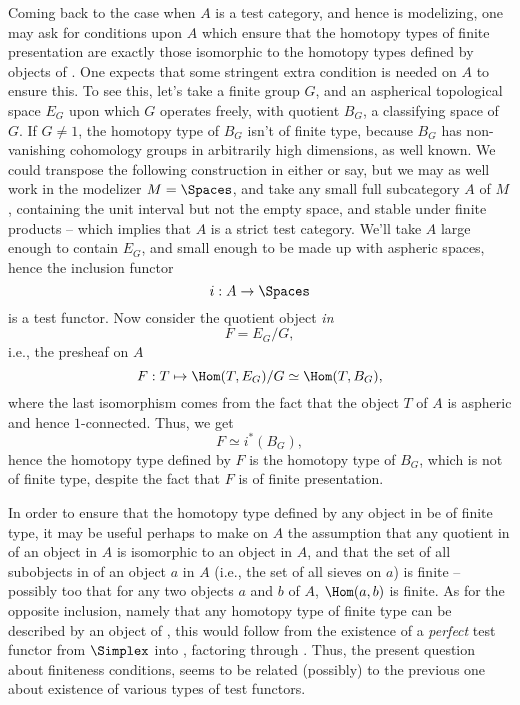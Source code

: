 Coming back to the case when $A$ is a test category, and hence \Ahat{}
is modelizing, one may ask for conditions upon $A$ which ensure that
the homotopy types of finite presentation are exactly those isomorphic
to the homotopy types defined by objects of \Ahatfp. One expects that
some stringent extra condition is needed on $A$ to ensure
this. To see this, let's take a finite group $G$, and an aspherical
topological space $E_G$ upon which $G$ operates freely, with quotient
$B_G$, a classifying space of $G$. If $G\ne1$, the homotopy type of
$B_G$ isn't of finite type, because $B_G$ has non-vanishing cohomology
groups in arbitrarily high dimensions, as well known. We could
transpose the following construction in either \Cat{} or \Simplexhat{}
say, but we may as well work in the modelizer $M=\Spaces$, and take
any small full subcategory $A$ of $M$, containing the unit interval
but not the empty space, and stable under finite products -- which
implies that $A$ is a strict test category. We'll take $A$ large
enough to contain $E_G$, and small enough to be made up with aspheric
spaces, hence the inclusion functor
\[i: A\to\Spaces\]
is a test functor. Now consider the quotient object \emph{in} \Ahat
\[F = E_G / G,\]
i.e., the presheaf on $A$
\[ F : T\mapsto \Hom(T,E_G)/G \simeq \Hom(T,B_G),\]
where the last isomorphism comes from the fact that the object $T$ of
$A$ is aspheric and hence $1$-connected. Thus, we get
\[F\simeq i^*(B_G),\]
hence the homotopy type defined by $F$ is the homotopy type of $B_G$,
which is not of finite type, despite the fact that $F$ is of finite
presentation.

In order to ensure that the homotopy type defined by any object in
\Ahatfp{} be of finite type, it may be useful perhaps to make on $A$
the assumption that any quotient in \Ahat{} of an object in $A$ is
isomorphic to an object in $A$, and that the set of all subobjects in
\Ahat{} of an object $a$ in $A$ (i.e., the set of all sieves on $a$)
is finite -- possibly too that for any two objects $a$ and $b$ of $A$,
$\Hom(a,b)$ is finite. As for the opposite inclusion, namely that any
homotopy type of finite type can be described by an object of \Ahatfp,
this would follow from the existence of a \emph{perfect} test functor
from $\Simplex$ into \Ahat, factoring through
\Ahatfp. Thus, the present question about finiteness conditions, seems
to be related (possibly) to the previous one about existence of
various types of test functors.

